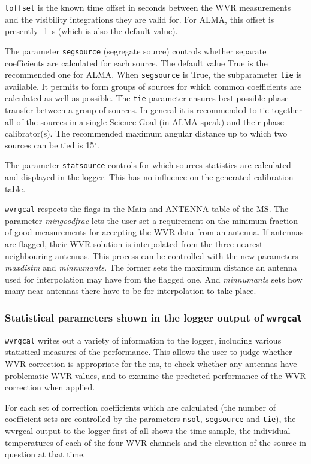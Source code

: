 {\tt toffset} is the known time offset in seconds between the WVR
measurements and the visibility integrations they are valid for. For
ALMA, this offset is presently -1~s (which is also the default value).

The parameter {\tt segsource} (segregate source) controls whether
separate coefficients are calculated for each source. The default
value True is the recommended one for ALMA.  When {\tt segsource} is
True, the subparameter {\tt tie} is available. It permits to form
groups of sources for which common coefficients are calculated as well
as possible. The {\tt tie} parameter ensures best possible phase
transfer between a group of sources. In general it is recommended to
tie together all of the sources in a single Science Goal (in ALMA
speak) and their phase calibrator(s).  The recommended maximum angular
distance up to which two sources can be tied is 15$^\circ$.

The parameter {\tt statsource} controls for which sources statistics are calculated and
displayed in the logger. This has no influence on the generated calibration table.

{\tt wvrgcal} respects the flags in the Main and ANTENNA table of the
MS. The parameter {\it mingoodfrac} lets the user set a requirement on
the minimum fraction of good measurements for accepting the WVR data
from an antenna.  If antennas are flagged, their WVR solution is
interpolated from the three nearest neighbouring antennas.  This
process can be controlled with the new parameters {\it maxdistm} and
{\it minnumants}. The former sets the maximum distance an antenna used
for interpolation may have from the flagged one. And {\it minnumants} sets
how many near antennas there have to be for interpolation to take
place.


\subsubsection{Statistical parameters shown in the logger output of {\tt wvrgcal}}

{\tt wvrgcal} writes out a variety of information to
the logger, including various statistical measures of the performance.
This allows the user to judge whether WVR correction is appropriate
for the ms, to check whether any antennas have problematic WVR values,
and to examine the predicted performance of the WVR correction when
applied.

For each set of correction coefficients which are calculated (the
number of coefficient sets are controlled by the parameters
{\tt nsol}, {\tt segsource} and {\tt tie}), the wvrgcal output to the logger
first of all shows the
time sample, the individual temperatures of each of the four WVR
channels and the elevation of the source in question at that time. 

